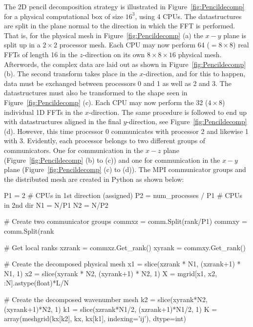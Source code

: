 \documentclass[final,1p,times]{elsarticle}
\begin{document}
The 2D pencil decomposition strategy is illustrated in Figure~\ref{fig:Pencildecomp} for a physical computational box of size $16^3$, using 4 CPUs. The datastructures are split in the plane normal to the direction in which the FFT is performed. That is, for the physical mesh in Figure~\ref{fig:Pencildecomp} (a) the $x-y$ plane is split up in a $2\times2$ processor mesh. Each CPU may now perform 64 ($= 8 \times 8$) real FFTs of length 16 in the $z$-direction on its own $8 \times 8 \times 16$ physical mesh. Afterwords, the complex data are laid out as shown in Figure~\ref{fig:Pencildecomp} (b). The second transform takes place in the $x$-direction, and for this to happen, data must be exchanged between processors 0 and 1 as well as 2 and 3. The datastructures must also be transformed to the shape seen in Figure~\ref{fig:Pencildecomp} (c). Each CPU may now perform the 32 ($4 \times 8$) individual 1D FFTs in the $x$-direction. The same procedure is followed to end up with datastructures aligned in the final $y$-direction, see Figure~\ref{fig:Pencildecomp} (d). However, this time processor 0 communicates with processor 2 and likewise 1 with 3. Evidently, each processor belongs to two different groups of communicators. One for communication in the $x-z$ plane (Figure~\ref{fig:Pencildecomp} (b) to (c)) and one for communication in the $x-y$ plane (Figure~\ref{fig:Pencildecomp} (c) to (d)). The MPI communicator groups and the distributed mesh are created in Python as shown below:

\noindent
\begin{minipage}[l]{\textwidth}
\begin{python}
P1 = 2  # CPUs in 1st direction (assigned)
P2 = num_processes / P1 # CPUs in 2nd dir
N1 = N/P1
N2 = N/P2

# Create two communicator groups
commxz = comm.Split(rank/P1)
commxy = comm.Split(rank%

# Get local ranks 
xzrank = commxz.Get_rank()
xyrank = commxy.Get_rank()

# Create the decomposed physical mesh
x1 = slice(xzrank * N1, (xzrank+1) * N1, 1)
x2 = slice(xyrank * N2, (xyrank+1) * N2, 1)
X = mgrid[x1, x2, :N].astype(float)*L/N

# Create the decomposed wavenumber mesh
k2 = slice(xyrank*N2, (xyrank+1)*N2, 1)
k1 = slice(xzrank*N1/2, (xzrank+1)*N1/2, 1)
K = array(meshgrid(kx[k2], kx, kx[k1], indexing='ij'), dtype=int)
\end{python}
\end{minipage}
\end{document}
